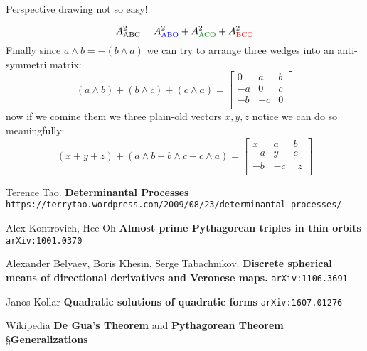 \documentclass[12pt]{article}
\begin{document}
\newpage

\\
Perspective drawing not so easy!

$$ A^2_{\color{black}{\text{ABC}}} = 
A^2_{\color{blue}{\text{ABO}}}+
A^2_{\color{green!50!black}{\text{ACO}}}+
A^2_{\color{red}{\text{BCO}}} $$
Finally since $a \wedge b = - (b \wedge a)$ we can try to arrange three wedges into an anti-symmetri matrix:
$$ 
(a \wedge b) + (b \wedge c) + (c \wedge a)=
\left[\begin{array}{ccc} 
0 & a & b \\ 
-a & 0 & c \\
-b & -c & 0\\
\end{array}\right]
$$
now if we comine them we three plain-old vectors $x,y,z$ notice we can do so meaningfully:
$$
(x+y+z) + 
(a \wedge b + b \wedge c + c \wedge a)=
\left[\begin{array}{rrr} 
x & a & b \\ 
-a & y & c \\
-b & -c & \;\,z\\
\end{array}\right]
 $$

\selectfont \fontsize{12}{10}\selectfont

\begin{thebibliography}{}


\item Terence Tao.  \textbf{Determinantal Processes} \\ \texttt{https://terrytao.wordpress.com/2009/08/23/determinantal-processes/}

\item Alex Kontrovich, Hee Oh \textbf{
Almost prime Pythagorean triples in thin orbits}
\texttt{arXiv:1001.0370}


\item Alexander Belyaev, Boris Khesin, Serge Tabachnikov. \textbf{Discrete spherical means of directional derivatives and Veronese maps.}
\texttt{arXiv:1106.3691}

\item Janos Kollar \textbf{Quadratic solutions of quadratic forms} \texttt{arXiv:1607.01276}

\item Wikipedia \textbf{De Gua's Theorem} and  \textbf{Pythagorean Theorem} \S \textbf{Generalizations}

\end{thebibliography}
\end{document}
